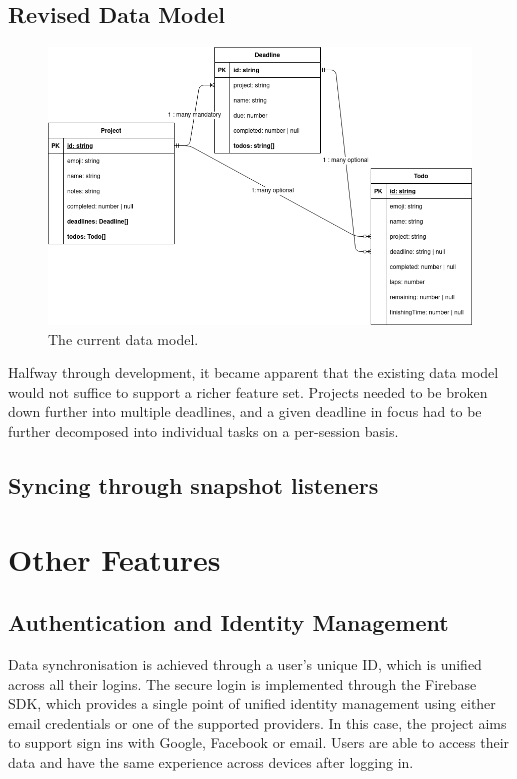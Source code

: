 \subsection{Revised Data Model}
\begin{figure}[h]
    \begin{center}
        \includegraphics[scale=0.5]{images/final_data_model.png}
    \end{center}
    \caption{The current data model.}
    \label{fig:app_current_data_model}
\end{figure}

Halfway through development, it became apparent that the existing data model would not suffice to support a richer feature set. Projects needed to be broken down further into multiple deadlines, and a given deadline in focus had to be further decomposed into individual tasks on a per-session basis.

\subsection{Syncing through snapshot listeners}

\section{Other Features}
\subsection{Authentication and Identity Management}
Data synchronisation is achieved through a user's unique ID, which is unified across all their logins. The secure login is implemented through the Firebase SDK, which provides a single point of unified identity management using either email credentials or one of the supported providers. In this case, the project aims to support sign ins with Google, Facebook or email. Users are able to access their data and have the same experience across devices after logging in.

